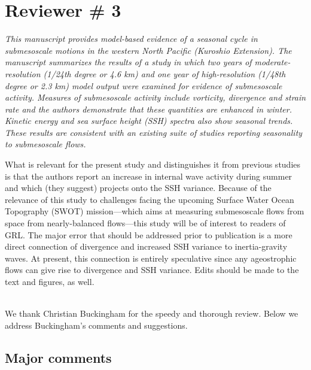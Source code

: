 \documentclass[11pt]{article}
\begin{document}
\section{Reviewer \# 3}
        {\it This manuscript provides model-based evidence of a seasonal cycle in submesoscale motions
         in the western North Pacific (Kuroshio Extension). The manuscript summarizes the results of
         a study in which two years of moderate-resolution (1/24th degree or 4.6 km) and one year of
         high-resolution (1/48th degree or 2.3 km) model output were examined for evidence of
         submesoscale activity. Measures of submesoscale activity include vorticity, divergence and
         strain rate and the authors demonstrate that these quantities are enhanced in winter. Kinetic
         energy and sea surface height (SSH) spectra also show seasonal trends. These results are
         consistent with an existing suite of studies reporting seasonality to submesoscale flows.

         What is relevant for the present study and distinguishes it from previous studies is that the
         authors report an increase in internal wave activity during summer and which (they suggest)
         projects onto the SSH variance. Because of the relevance of this study to challenges facing
         the upcoming Surface Water Ocean Topography (SWOT) mission—which aims at measuring
         submesoscale flows from space from nearly-balanced flows—this study will be of interest to
         readers of GRL. The major error that should be addressed prior to publication is a more direct
         connection of divergence and increased SSH variance to inertia-gravity waves. At present,
         this connection is entirely speculative since any ageostrophic flows can give rise to
        divergence and SSH variance. Edits should be made to the text and figures, as well.}\\

        We thank  Christian Buckingham for the speedy and thorough review. Below we address
                  Buckingham's comments and suggestions.


\subsection{Major comments}
\end{document}
